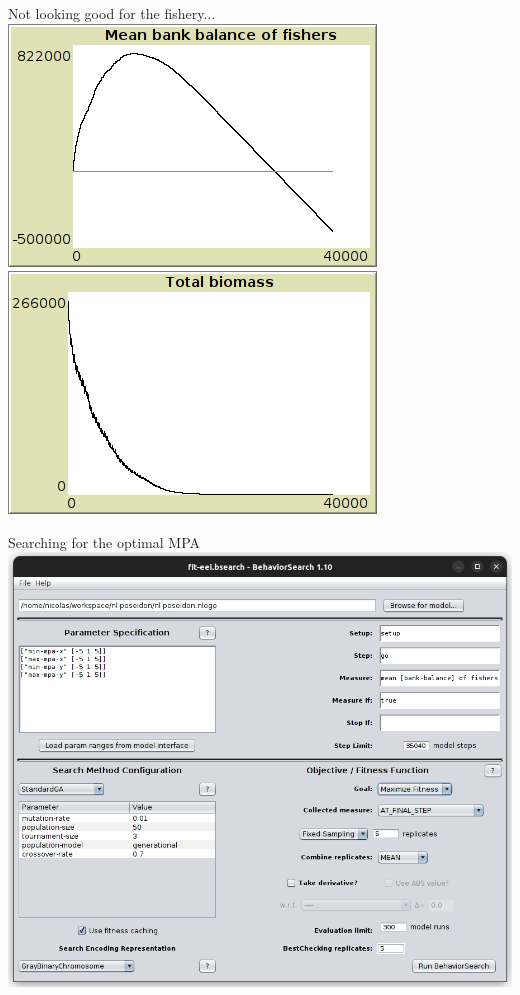 \documentclass[table, 14pt, aspectratio=169]{beamer}
\begin{document}
\begin{frame}{Not looking good for the fishery...}
  \includegraphics[width=0.49\linewidth]{images/business-as-usual-balance.png}
  \hfill
  \includegraphics[width=0.49\linewidth]{images/business-as-usual-biomass.png}
\end{frame}

\begin{frame}{Searching for the optimal MPA}
  \centering
  \includegraphics[height=0.8\textheight]{images/bsearch_mpa.png}
\end{frame}
\end{document}
